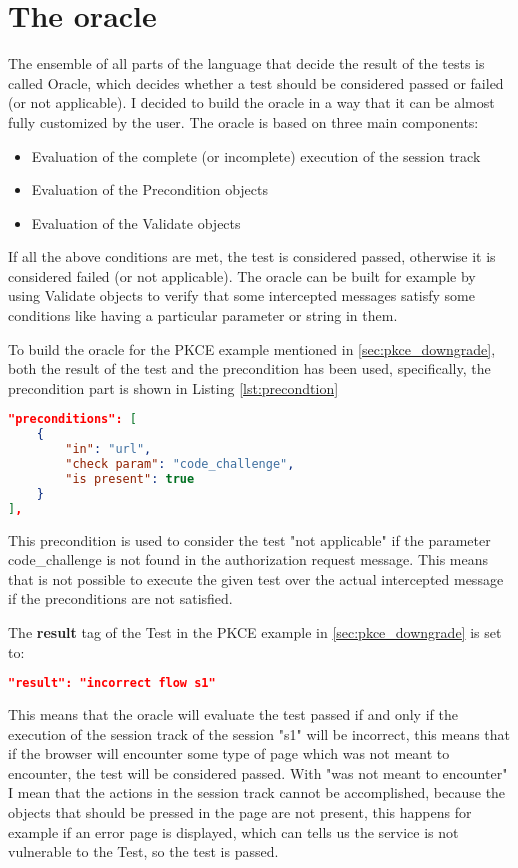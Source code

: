 \section{The oracle}
The ensemble of all parts of the language that decide the result of the tests is called Oracle,
which decides whether a test should be considered passed or failed (or not applicable). I decided to build the oracle in a way that it can be almost fully customized by the user. 
The oracle is based on three main components:
\begin{itemize}
    \item Evaluation of the complete (or incomplete) execution of the \gls{session track} 
    \item Evaluation of the Precondition objects
    \item Evaluation of the Validate objects
\end{itemize}
If all the above conditions are met, the test is considered passed, otherwise it is considered failed (or not applicable).
The oracle can be built for example by using Validate objects to verify that some intercepted messages satisfy some conditions like having a particular parameter or string in them.

To build the oracle for the PKCE example mentioned in \ref{sec:pkce_downgrade}, both the result of the test and the precondition has been used, specifically, the precondition part is shown in Listing \ref{lst:precondtion}
\begin{lstlisting}[language=json, caption=Precondition definition, label={lst:precondtion}]
"preconditions": [
    {
        "in": "url",
        "check param": "code_challenge",
        "is present": true
    }
],
\end{lstlisting}
This precondition is used to consider the test "not applicable" if the parameter code\_challenge is not found in the authorization request message. This means that is not possible to execute the given test over the actual intercepted message if the preconditions are not satisfied.

The \textbf{result} tag of the Test in the PKCE example in \ref{sec:pkce_downgrade} is set to:
\begin{lstlisting}[language=json]
"result": "incorrect flow s1"
\end{lstlisting}
This means that the oracle will evaluate the test passed if and only if the execution of the \gls{session track} of the session "s1" will be incorrect, this means that if the browser will encounter some type of page which was not meant to encounter, the test will be considered passed. With "was not meant to encounter" I mean that the actions in the \gls{session track} cannot be accomplished, because the objects that should be pressed in the page are not present, this happens for example if an error page is displayed, which can tells us the service is not vulnerable to the Test, so the test is passed.

